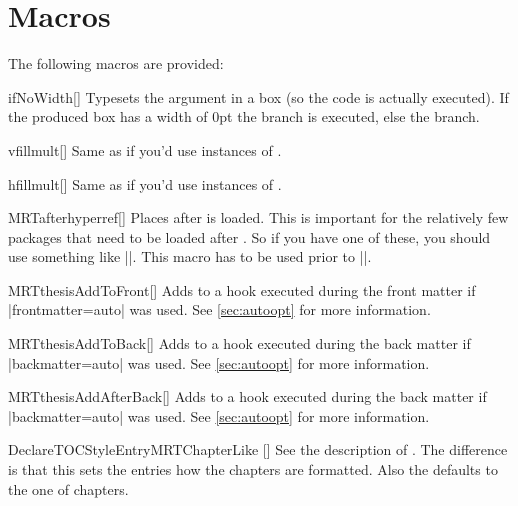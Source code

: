 \section{Macros}\label{sec:thesis:mac}%
The following macros are provided:
\begin{describemacroTF}{ifNoWidth}[]
  Typesets the argument in a box (so the code is actually executed). If the
  produced box has a width of 0pt the  branch is executed, else the
   branch.
\end{describemacroTF}
\begin{describemacro}{vfillmult}[]
  Same as if you'd use  instances of .
\end{describemacro}
\begin{describemacro}{hfillmult}[]
  Same as if you'd use  instances of .
\end{describemacro}
\begin{describemacro}{MRTafterhyperref}[]
  Places  after  is loaded. This is important for
  the relatively few packages that need to be loaded after . So if
  you have one of these, you should use something like
  \bverb|\MRTafterhyperref{\usepackage{cleveref}}|. This macro has to be used
  prior to \bverb||.
\end{describemacro}
\begin{describemacro}{MRTthesisAddToFront}[]
  Adds  to a hook executed during the front matter if
  \bverb|frontmatter=auto| was used. See \autoref{sec:autoopt} for more
  information.
\end{describemacro}
\begin{describemacro}{MRTthesisAddToBack}[]
  Adds  to a hook executed during the back matter if
  \bverb|backmatter=auto| was used. See \autoref{sec:autoopt} for more
  information.
\end{describemacro}
\begin{describemacro}{MRTthesisAddAfterBack}[]
  Adds  to a hook executed during the back matter if
  \bverb|backmatter=auto| was used. See \autoref{sec:autoopt} for more
  information.
\end{describemacro}
\begin{describemacro}{DeclareTOCStyleEntryMRTChapterLike}%
  [\hskip0pt]
  See the description of . The difference
  is that this sets the entries how the chapters are formatted. Also the
   defaults to the one of chapters.
\end{describemacro}
